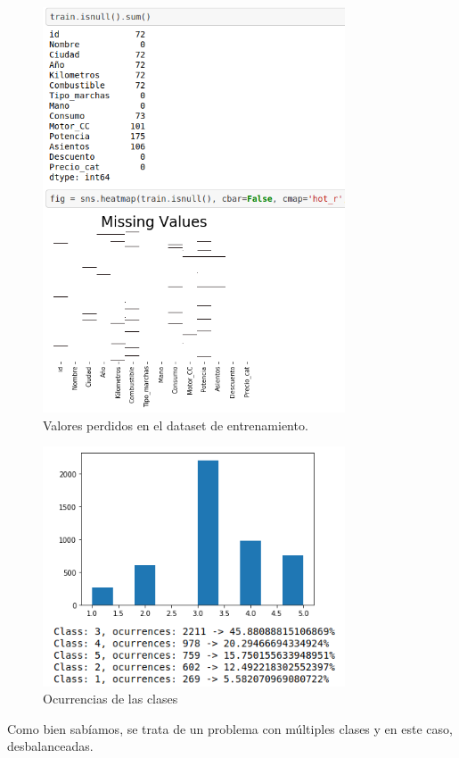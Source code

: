 \begin{figure}[H]
\centering
\includegraphics[width=0.8\textwidth]{imagenes/mv.png}
\caption{Valores perdidos en el dataset de entrenamiento.}
\end{figure}

\begin{figure}[H]
\centering
\includegraphics[width=0.8\textwidth]{imagenes/classes.png}
\caption{Ocurrencias de las clases}
\end{figure}

Como bien sabíamos, se trata de un problema con múltiples clases y en este caso, desbalanceadas.
